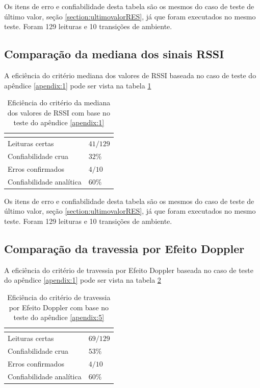 Os itens de erro e confiabilidade desta tabela são os mesmos do caso de teste de último valor, seção \ref{section:ultimovalorRES}, já que foram executados no mesmo teste. Foram 129 leituras e 10 transições de ambiente.

\subsection{Comparação da mediana dos sinais RSSI}

A eficiência do critério mediana dos valores de RSSI baseada no caso de teste do apêndice \ref{apendix:1} pode ser vista na tabela \ref{tab:resultados4}

\begin{table}[H]
\centering
\caption{Eficiência do critério da mediana dos valores de RSSI com base no teste do apêndice \ref{apendix:1} }
\label{tab:resultados4}
\begin{tabular}{p{5cm} p{5cm}}
\hline
\multicolumn{2}{c}{\cellcolor{lightgray}{Eficiência do critério: Mediana dos valores de RSSI}} \\ \hline
Leituras certas         &   $41 / 129$        \\
Confiabilidade crua    &   $32\%$     \\
Erros confirmados          &  $4 / 10$        \\
Confiabilidade analítica & $60\%$ \\ \hline
\end{tabular}
\end{table}

Os itens de erro e confiabilidade desta tabela são os mesmos do caso de teste de último valor, seção \ref{section:ultimovalorRES}, já que foram executados no mesmo teste. Foram 129 leituras e 10 transições de ambiente.

\subsection{Comparação da travessia por Efeito Doppler}


A eficiência do critério de travessia por Efeito Doppler baseada no caso de teste do apêndice \ref{apendix:1} pode ser vista na tabela \ref{tab:resultados5}

\begin{table}[H]
\centering
\caption{Eficiência do critério de travessia por Efeito Doppler com base no teste do apêndice \ref{apendix:5} }
\label{tab:resultados5}
\begin{tabular}{p{5cm} p{5cm}}
\hline
\multicolumn{2}{c}{\cellcolor{lightgray}{Eficiência do critério: Travessia por efeito Doppler}} \\ \hline
Leituras certas         &   $69 / 129$        \\
Confiabilidade crua    &   $53\%$     \\
Erros confirmados          &  $4 / 10$        \\
Confiabilidade analítica & $60\%$ \\ \hline
\end{tabular}
\end{table}

